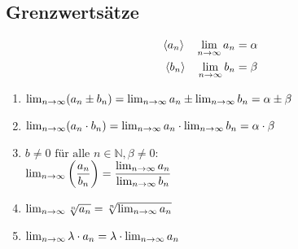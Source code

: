 \subsection{Grenzwertsätze}

\begin{align*}
	\langle a_n \rangle \quad \lim_{n \rightarrow{} \infty} a_n & = \alpha \\
	\langle b_n \rangle \quad \lim_{n \rightarrow{} \infty} b_n & = \beta
\end{align*}

\begin{enumerate}
	\item \( \lim_{n \rightarrow{} \infty} (a_n \pm b_n)
	      = \lim_{n \rightarrow{} \infty} a_n \pm \lim_{n \rightarrow{} \infty} b_n
	      = \alpha \pm \beta \)
	\item \( \lim_{n \rightarrow{} \infty} (a_n \cdot b_n)
	      = \lim_{n \rightarrow{} \infty} a_n \cdot \lim_{n \rightarrow{} \infty} b_n
	      = \alpha \cdot \beta \)
	\item \( b \neq 0 \text{ für alle } n \in \mathbb{N},
	      \beta \neq 0 \text{:} \) \\
	      \( \lim_{n \rightarrow{} \infty} \left(\dfrac{a_n}{b_n}\right)
	      = \dfrac{\lim_{n \rightarrow{} \infty} a_n}{\lim_{n \rightarrow{} \infty} b_n} \)
	\item \(
	      \lim_{n \rightarrow{} \infty} \sqrt[n]{a_n}
	      = \sqrt[n]{\lim_{n \rightarrow{} \infty} a_n}
	      \)
	\item  \(
	      \lim_{n \rightarrow{} \infty} \lambda \cdot a_n
	      = \lambda \cdot \lim_{n \rightarrow{} \infty} a_n
	      \)
\end{enumerate}
